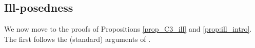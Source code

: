 \documentclass[%
11pt,  reqno]{amsart}
\newcommand{\5}{\textup{V}}
\newcommand{\FL}{\mathcal{F} L}
\newcommand{\F}{\mathcal{F}}
\newtheorem{proposition}[theorem]{Proposition}
\theoremstyle{remark}
\newcommand{\R}{\mathbb{R}}
\numberwithin{equation}{section}
\numberwithin{theorem}{section}
\begin{document}
\subsection{Ill-posedness} We now move to the proofs of Propositions \ref{prop_C3_ill} and \ref{prop:ill_intro}. The first follows the (standard) arguments of \cite{taobejenaru, bou_ill_kdv, MolTzeSaut_ill, Tzvetkov_ill}.





\end{document}
